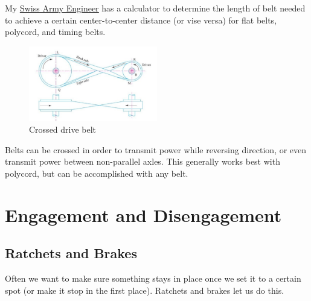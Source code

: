 \documentclass[10pt,letterpaper]{book}
\begin{document}
My \href{http://thaddeus-maximus.github.io/swissarmyengineer/}{\color{red}\underline{Swiss Army Engineer}} has a calculator to determine the length of belt needed to achieve a certain center-to-center distance (or vise versa) for flat belts, polycord, and timing belts.

\begin{figure}[H]
	\includegraphics[width=0.5\textwidth]{imgs/belt_crossed.png}
	\caption{Crossed drive belt}
\end{figure}
	Belts can be crossed in order to transmit power while reversing direction, or even transmit power between non-parallel axles. This generally works best with polycord, but can be accomplished with any belt.

\newpage
\section{Engagement and Disengagement}

\subsection{Ratchets and Brakes}

Often we want to make sure something stays in place once we set it to a certain spot (or make it stop in the first place). Ratchets and brakes let us do this.
\end{document}
